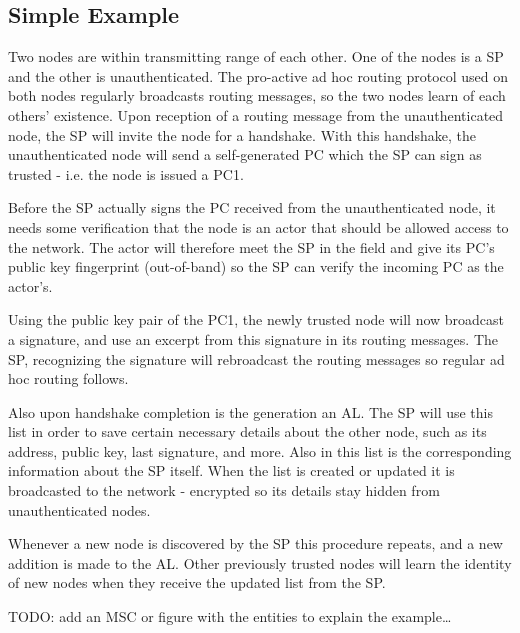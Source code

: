 \subsection{Simple Example}
Two nodes are within transmitting range of each other. One of the nodes is a
\ac{SP} and the other is unauthenticated. The pro-active ad hoc routing protocol
used on both nodes regularly broadcasts routing messages, so the two nodes learn
of each others' existence. Upon reception of a routing message from the
unauthenticated node, the \ac{SP} will invite the node for a handshake. With
this handshake, the unauthenticated node will send a self-generated \ac{PC}
which the \ac{SP} can sign as trusted - i.e. the node is issued a \ac{PC1}.

Before the \ac{SP} actually signs the \ac{PC} received from the unauthenticated
node, it needs some verification that the node is an actor that should be
allowed access to the network. The actor will therefore meet the \ac{SP} in the
field and give its \ac{PC}'s public key fingerprint (out-of-band) so the \ac{SP}
can verify the incoming \ac{PC} as the actor's.

Using the public key pair of the \ac{PC1}, the newly trusted node will now
broadcast a signature, and use an excerpt from this signature in its routing
messages. The \ac{SP}, recognizing the signature will rebroadcast the routing
messages so regular ad hoc routing follows.

Also upon handshake completion is the generation an \ac{AL}. The \ac{SP} will
use this list in order to save certain necessary details about the other node,
such as its address, public key, last signature, and more. Also in this list is
the corresponding information about the \ac{SP} itself. When the list is created
or updated it is broadcasted to the network - encrypted so its details stay
hidden from unauthenticated nodes.

Whenever a new node is discovered by the \ac{SP} this procedure repeats, and a
new addition is made to the \ac{AL}. Other previously trusted nodes will learn
the identity of new nodes when they receive the updated list from the \ac{SP}.

TODO: add an MSC or figure with the entities to explain the example\ldots
